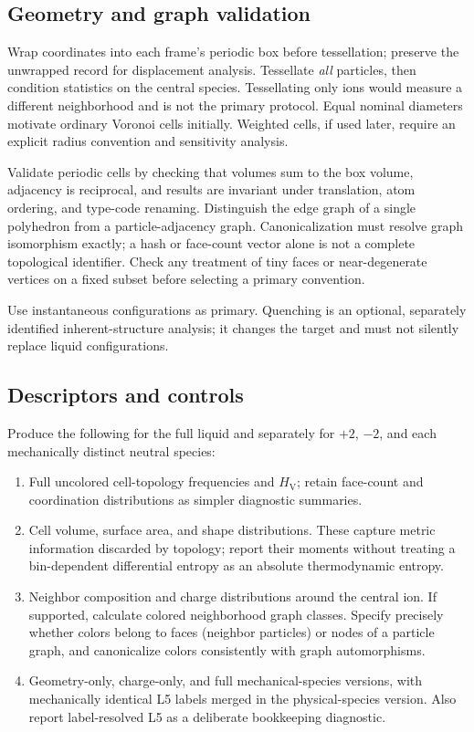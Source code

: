 \documentclass[11pt,a4paper]{article}
\newcommand{\Hv}{H_{\mathrm V}}
\begin{document}
\subsection{Geometry and graph validation}
Wrap coordinates into each frame's periodic box before tessellation; preserve
the unwrapped record for displacement analysis. Tessellate \emph{all} particles,
then condition statistics on the central species. Tessellating only ions would
measure a different neighborhood and is not the primary protocol. Equal nominal
diameters motivate ordinary Voronoi cells initially. Weighted cells, if used
later, require an explicit radius convention and sensitivity analysis.

Validate periodic cells by checking that volumes sum to the box volume,
adjacency is reciprocal, and results are invariant under translation, atom
ordering, and type-code renaming. Distinguish the edge graph of a single
polyhedron from a particle-adjacency graph. Canonicalization must resolve graph
isomorphism exactly; a hash or face-count vector alone is not a complete
topological identifier. Check any treatment of tiny faces or near-degenerate
vertices on a fixed subset before selecting a primary convention.

Use instantaneous configurations as primary. Quenching is an optional,
separately identified inherent-structure analysis; it changes the target and
must not silently replace liquid configurations.

\subsection{Descriptors and controls}
Produce the following for the full liquid and separately for $+2$, $-2$, and
each mechanically distinct neutral species:
\begin{enumerate}
\item Full uncolored cell-topology frequencies and $\Hv$; retain face-count
and coordination distributions as simpler diagnostic summaries.
\item Cell volume, surface area, and shape distributions. These capture metric
information discarded by topology; report their moments without treating a
bin-dependent differential entropy as an absolute thermodynamic entropy.
\item Neighbor composition and charge distributions around the central ion.
If supported, calculate colored neighborhood graph classes. Specify precisely
whether colors belong to faces (neighbor particles) or nodes of a particle
graph, and canonicalize colors consistently with graph automorphisms.
\item Geometry-only, charge-only, and full mechanical-species versions, with
mechanically identical L5 labels merged in the physical-species version.
Also report label-resolved L5 as a deliberate bookkeeping diagnostic.
\end{enumerate}
\end{document}
